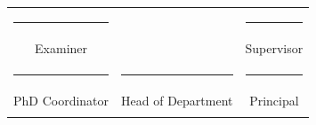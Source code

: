 \begin{center}
\begin{tabular}{ccc}
      \rule{4.0cm}{1sp} & \hspace{0.7in}                & \hspace{0.3in} \rule{4.0cm}{1sp} \\ \vspace{0.65in}
       Examiner & \hspace{1in}             & \hspace{0.3in} Supervisor \\
      \rule{4.0cm}{1sp} & \hspace{0.5in} \rule{4.0cm}{1sp}                  &\hspace{0.45in} \rule{4.0cm}{1sp} \\
      PhD Coordinator & \hspace{0.5in} Head of Department                &\hspace{0.65in} Principal \\\\
    \end{tabular}
\end{center}




%
\cleardoublepage

